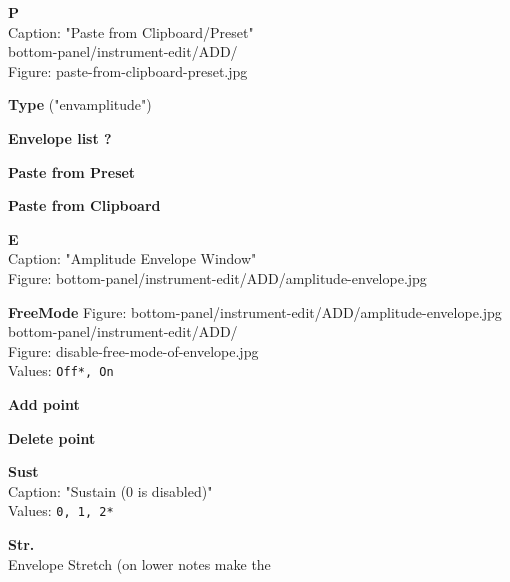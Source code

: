 \documentclass[
 11pt,
 twoside,
 a4paper,
 headinclude,
 footinclude,
 final                                 %
]{article}
\begin{document}
\begin{enumber}
\begin{enumber}
\begin{enumber}
\begin{enumber}
\begin{enumber}
\begin{enumber}
                  \end{enumber}
               \item \textbf{P} \\
                  Caption: "Paste from Clipboard/Preset" \\
                  bottom-panel/instrument-edit/ADD/ \\
                     Figure: paste-from-clipboard-preset.jpg
                  \begin{enumber}
                     \item \textbf{Type} ("envamplitude")
                     \item \textbf{Envelope list ?}
                     \item \textbf{Paste from Preset}
                     \item \textbf{Paste from Clipboard}
                  \end{enumber}
               \item \textbf{E} \\
                  Caption: "Amplitude Envelope Window" \\
                  Figure: bottom-panel/instrument-edit/ADD/amplitude-envelope.jpg
                  \begin{enumber}
                     \item \textbf{FreeMode}
                        Figure: bottom-panel/instrument-edit/ADD/amplitude-envelope.jpg \\
                        bottom-panel/instrument-edit/ADD/ \\
                           Figure: disable-free-mode-of-envelope.jpg \\
                        Values: \texttt{Off*, On}
                     \begin{enumber}
                        \item \textbf{Add point}
                        \item \textbf{Delete point}
                        \item \textbf{Sust} \\
                           Caption: "Sustain (0 is disabled)" \\
                           Values: \texttt{0, 1, 2*}
                        \item \textbf{Str.} \\
                           Envelope Stretch (on lower notes make the \\

\end{enumber}
\end{enumber}
\end{enumber}
\end{enumber}
\end{enumber}
\end{enumber}
\end{enumber}
\end{document}
